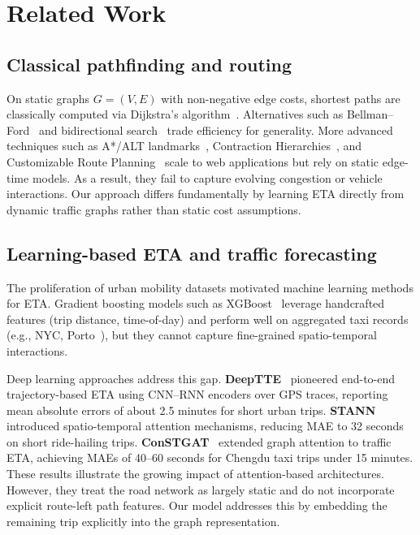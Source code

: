 \section{Related Work}

\subsection{Classical pathfinding and routing}
On static graphs $G=(V,E)$ with non-negative edge costs, shortest paths are classically computed via Dijkstra’s algorithm~\cite{dijkstra1959}. Alternatives such as Bellman–Ford~\cite{bellman1958routing} and bidirectional search~\cite{pohl1971bi} trade efficiency for generality. More advanced techniques such as A*/ALT landmarks~\cite{goldberg2005}, Contraction Hierarchies~\cite{geisberger2008}, and Customizable Route Planning~\cite{delling2011} scale to web applications but rely on static edge-time models. As a result, they fail to capture evolving congestion or vehicle interactions. Our approach differs fundamentally by learning ETA directly from dynamic traffic graphs rather than static cost assumptions.

\subsection{Learning-based ETA and traffic forecasting}
The proliferation of urban mobility datasets motivated machine learning methods for ETA. Gradient boosting models such as XGBoost~\cite{chen2016xgboost} leverage handcrafted features (trip distance, time-of-day) and perform well on aggregated taxi records (e.g., NYC, Porto~\cite{nyc_tlc,moreira2013porto}), but they cannot capture fine-grained spatio-temporal interactions.

Deep learning approaches address this gap. \textbf{DeepTTE}~\cite{deepTTE2018} pioneered end-to-end trajectory-based ETA using CNN–RNN encoders over GPS traces, reporting mean absolute errors of about 2.5 minutes for short urban trips. \textbf{STANN}~\cite{stann2021} introduced spatio-temporal attention mechanisms, reducing MAE to 32 seconds on short ride-hailing trips. \textbf{ConSTGAT}~\cite{constgat2020} extended graph attention to traffic ETA, achieving MAEs of 40–60 seconds for Chengdu taxi trips under 15 minutes. These results illustrate the growing impact of attention-based architectures. However, they treat the road network as largely static and do not incorporate explicit route-left path features. Our model addresses this by embedding the remaining trip explicitly into the graph representation.

